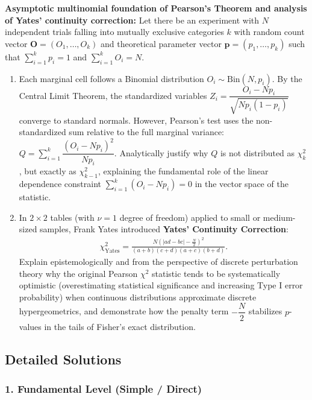 \begin{problema}
	\label{prob:chi-desaf-teorema-pearson}
	\textbf{Asymptotic multinomial foundation of Pearson's Theorem and analysis of Yates' continuity correction:}
	Let there be an experiment with $N$ independent trials falling into mutually exclusive categories $k$ with random count vector $\mathbf{O} = (O_1, \dots, O_k)$ and theoretical parameter vector $\mathbf{p} = (p_1, \dots, p_k)$ such that $\sum_{i=1}^k p_i = 1$ and $\sum_{i=1}^k O_i = N$.
	\begin{enumerate}
		\item Each marginal cell follows a Binomial distribution $O_i \sim \text{Bin}(N, p_i)$. By the Central Limit Theorem, the standardized variables $Z_i = \dfrac{O_i - Np_i}{\sqrt{Np_i(1-p_i)}}$ converge to standard normals. However, Pearson's test uses the non-standardized sum relative to the full marginal variance: $Q = \sum_{i=1}^k \dfrac{(O_i - Np_i)^2}{Np_i}$. Analytically justify why $Q$ is not distributed as $\chi^2_k$, but exactly as $\chi^2_{k-1}$, explaining the fundamental role of the linear dependence constraint $\sum_{i=1}^k (O_i - Np_i) = 0$ in the vector space of the statistic.
		\item In $2 \times 2$ tables (with $\nu = 1$ degree of freedom) applied to small or medium-sized samples, Frank Yates introduced \textbf{Yates' Continuity Correction}:
		\begin{align}
			\chi^2_{\text{Yates}} = \frac{N \left( |ad - bc| - \frac{N}{2} \right)^2}{(a+b)(c+d)(a+c)(b+d)}.
		\end{align}
		Explain epistemologically and from the perspective of discrete perturbation theory why the original Pearson $\chi^2$ statistic tends to be systematically optimistic (overestimating statistical significance and increasing Type I error probability) when continuous distributions approximate discrete hypergeometrics, and demonstrate how the penalty term $-\dfrac{N}{2}$ stabilizes $p$-values in the tails of Fisher's exact distribution.
	\end{enumerate}
\end{problema}


\subsection{Detailed Solutions}

\subsubsection*{1. Fundamental Level (Simple / Direct)}

